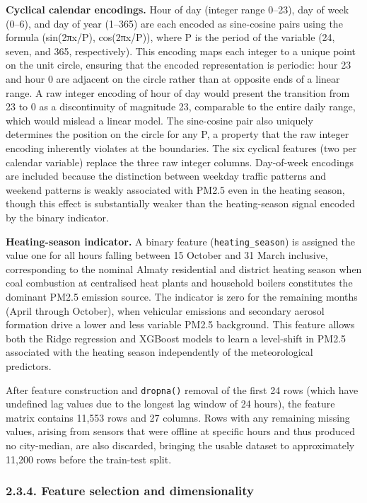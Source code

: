 \textbf{Cyclical calendar encodings.} Hour of day (integer range 0--23), day of week (0--6), and day of year (1--365) are each encoded as sine-cosine pairs using the formula (sin(2πx/P), cos(2πx/P)), where P is the period of the variable (24, seven, and 365, respectively). This encoding maps each integer to a unique point on the unit circle, ensuring that the encoded representation is periodic: hour 23 and hour 0 are adjacent on the circle rather than at opposite ends of a linear range. A raw integer encoding of hour of day would present the transition from 23 to 0 as a discontinuity of magnitude 23, comparable to the entire daily range, which would mislead a linear model. The sine-cosine pair also uniquely determines the position on the circle for any P, a property that the raw integer encoding inherently violates at the boundaries. The six cyclical features (two per calendar variable) replace the three raw integer columns. Day-of-week encodings are included because the distinction between weekday traffic patterns and weekend patterns is weakly associated with PM2.5 even in the heating season, though this effect is substantially weaker than the heating-season signal encoded by the binary indicator.

\textbf{Heating-season indicator.} A binary feature (\texttt{heating\_season}) is assigned the value one for all hours falling between 15 October and 31 March inclusive, corresponding to the nominal Almaty residential and district heating season when coal combustion at centralised heat plants and household boilers constitutes the dominant PM2.5 emission source. The indicator is zero for the remaining months (April through October), when vehicular emissions and secondary aerosol formation drive a lower and less variable PM2.5 background. This feature allows both the Ridge regression and XGBoost models to learn a level-shift in PM2.5 associated with the heating season independently of the meteorological predictors.

After feature construction and \texttt{dropna()} removal of the first 24 rows (which have undefined lag values due to the longest lag window of 24 hours), the feature matrix contains 11,553 rows and 27 columns. Rows with any remaining missing values, arising from sensors that were offline at specific hours and thus produced no city-median, are also discarded, bringing the usable dataset to approximately 11,200 rows before the train-test split.

\subsubsection{2.3.4. Feature selection and dimensionality}\label{feature-selection-and-dimensionality}

